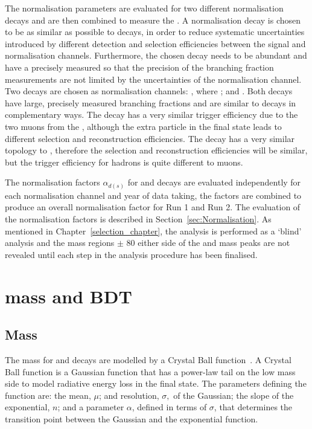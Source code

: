The normalisation parameters are evaluated for two different normalisation decays and are then combined to measure the \bmumu \BFs. 
A normalisation decay is chosen to be as similar as possible to \bmumu decays, in order to reduce systematic uncertainties introduced by different detection and selection efficiencies between the signal and normalisation channels. Furthermore, the chosen decay needs to be abundant and have a precisely measured \BF so that the precision of the \bmumu branching fraction measurements are not limited by the uncertainties of the normalisation channel. Two decays are chosen as normalisation channels: \bujpsik, where \jpsimumu; and \bdkpi. Both decays have large, precisely measured branching fractions and are similar to \bmumu decays in complementary ways. The \bujpsik decay has a very similar trigger efficiency due to the two muons from the \jpsi, although the extra particle in the final state leads to different selection and reconstruction efficiencies. The \bdkpi decay has a very similar topology to \bmumu, therefore the selection and reconstruction efficiencies will be similar, but the trigger efficiency for hadrons is quite different to muons.  

The normalisation factors $\alpha_{d(s)}$ for \bdmumu and \bsmumu decays are evaluated independently for each normalisation channel and year of data taking, the factors are combined to produce an overall normalisation factor for Run 1 and Run 2. The evaluation of the normalisation factors is described in Section~\ref{sec:Normalisation}.
As mentioned in Chapter~\ref{selection_chapter}, the analysis is performed as a `blind' analysis and the mass regions $\pm$ 80 \mevcc either side of the \bs and \bd mass peaks are not revealed until each step in the analysis procedure has been finalised. 
\section[\bmumu mass and BDT \pdfs]{\boldmath{\bmumu} mass and BDT \pdfs}
\label{sec:signalPdfs}

\subsection{Mass \pdfs}
The mass \pdfs for \bdmumu and \bsmumu decays are modelled by a Crystal Ball function~\cite{Skwarnicki:1986xj}. A Crystal Ball function is a Gaussian function that has a power-law tail on the low mass side to model radiative energy loss in the final state. The parameters defining the function are: the mean, $\mu$; and resolution, $\sigma,$ of the Gaussian; the slope of the exponential, $n$; and a parameter $\alpha$, defined in terms of $\sigma$, that determines the transition point between the Gaussian and the exponential function. 


